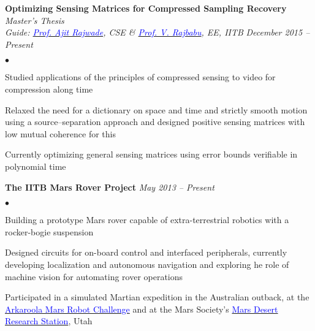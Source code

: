 \documentclass[margin,line]{res}
\newenvironment{list2}{
  \begin{list}{$\bullet$}{%
      \setlength{\itemsep}{0in}
      \setlength{\parsep}{0in} \setlength{\parskip}{0in}
      \setlength{\topsep}{0in} \setlength{\partopsep}{0in} 
      \setlength{\leftmargin}{0.18in}}}{\end{list}}
\begin{document}
\begin{resume}
{\bf Optimizing Sensing Matrices for Compressed Sampling Recovery} \hfill \textit{Master's Thesis} \\
{\em Guide: \href{https://www.cse.iitb.ac.in/~ajitvr}{\textcolor{blue}{Prof. Ajit Rajwade}}, CSE \& \href{https://www.ee.iitb.ac.in/wiki/faculty/rajbabu}{\textcolor{blue}{Prof. V. Rajbabu}}, EE, IITB} \hfill {\it December 2015 -- Present} \\
\vspace*{-.13in}
\begin{list2}
\item Studied applications of the principles of compressed sensing to video for compression along time
\item Relaxed the need for a dictionary on space and time and strictly smooth motion using a source--separation approach and designed positive sensing matrices with low mutual coherence for this
\item Currently optimizing general sensing matrices using error bounds verifiable in polynomial time
\end{list2}

\vspace*{-0.13in}

{\bf The IITB Mars Rover Project}
\hfill {\it May 2013 -- Present} \\
\vspace*{-.13in}
\begin{list2}
\item Building a prototype Mars rover capable of extra-terrestrial robotics with a rocker-bogie suspension
\item Designed circuits for on-board control and interfaced peripherals, currently developing localization and autonomous navigation and exploring he role of machine vision for automating rover operations
\item Participated in a simulated Martian expedition in the Australian outback, at the \href{http://marssociety.org.au/article/arkaroola-mars-robot-challenge-spaceward-bound-expedition}{\textcolor{blue} {Arkaroola Mars Robot Challenge}} and at the Mars Society's \href{http://mdrs.marssociety.org/}{\textcolor{blue} {Mars Desert Research Station}}, Utah
\end{list2}

\vspace*{-0.13in}


\end{resume}
\end{document}

